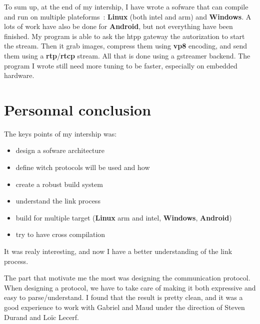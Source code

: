\documentclass[a4paper,11pt]{custom}
\newcommand{\rtp}{\textbf{rtp}}
\newcommand{\rtcp}{\textbf{rtcp}}
\newcommand{\vpx}{\textbf{vp8}}
\newcommand{\linux}{\textbf{Linux}}
\newcommand{\win}{\textbf{Windows}}
\newcommand{\android}{\textbf{Android}}
\begin{document}
To sum up, at the end of my intership, I have wrote a sofware that can compile
and run on multiple plateforms~: \linux{} (both intel and arm) and \win. A lots
of work have also be done for \android, but not everything have been finished.
My program is able to ask the htpp gateway the autorization to start the stream.
Then it grab images, compress them using \vpx{} encoding, and send them using a
\rtp{}/\rtcp{} stream. All that is done using a gstreamer backend. The program I
wrote still need more tuning to be faster, especially on embedded hardware.

\chapter{Personnal conclusion}

The keys points of my intership was:
\begin{itemize}
\item design a sofware architecture
\item define witch protocols will be used and how
\item create a robust build system
\item understand the link process
\item build for multiple target (\linux{} arm and intel, \win, \android)
\item try to have cross compilation
\end{itemize}

It was realy interesting, and now I have a better understanding of the link
process.

The part that motivate me the most was designing the communication protocol.
When designing a protocol, we have to take care of making it both expressive and
easy to parse/understand. I found that the result is pretty clean, and it was a
good experience to work with Gabriel and Maud under the direction of Steven
Durand and Loïc Lecerf.
\end{document}
